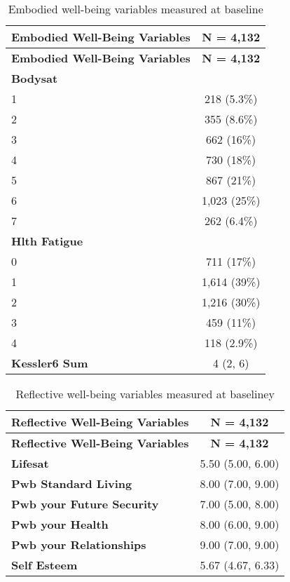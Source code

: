 \documentclass[
  singlecolumn,
  9pt]{article}
\begin{document}
\hypertarget{tbl-table_embody_vars_dogs}{}
\begin{longtable}[]{@{}lc@{}}
\caption{\label{tbl-table_embody_vars_dogs}Embodied well-being variables
measured at baseline}\tabularnewline
\toprule\noalign{}
\textbf{Embodied Well-Being Variables} & \textbf{N = 4,132} \\
\midrule\noalign{}
\endfirsthead
\toprule\noalign{}
\textbf{Embodied Well-Being Variables} & \textbf{N = 4,132} \\
\midrule\noalign{}
\endhead
\bottomrule\noalign{}
\endlastfoot
\textbf{Bodysat} & \\
1 & 218 (5.3\%) \\
2 & 355 (8.6\%) \\
3 & 662 (16\%) \\
4 & 730 (18\%) \\
5 & 867 (21\%) \\
6 & 1,023 (25\%) \\
7 & 262 (6.4\%) \\
\textbf{Hlth Fatigue} & \\
0 & 711 (17\%) \\
1 & 1,614 (39\%) \\
2 & 1,216 (30\%) \\
3 & 459 (11\%) \\
4 & 118 (2.9\%) \\
\textbf{Kessler6 Sum} & 4 (2, 6) \\
\end{longtable}

\hypertarget{tbl-table_reflective_vars_dogs}{}
\begin{longtable}[]{@{}lc@{}}
\caption{\label{tbl-table_reflective_vars_dogs}Reflective well-being
variables measured at baseliney}\tabularnewline
\toprule\noalign{}
\textbf{Reflective Well-Being Variables} & \textbf{N = 4,132} \\
\midrule\noalign{}
\endfirsthead
\toprule\noalign{}
\textbf{Reflective Well-Being Variables} & \textbf{N = 4,132} \\
\midrule\noalign{}
\endhead
\bottomrule\noalign{}
\endlastfoot
\textbf{Lifesat} & 5.50 (5.00, 6.00) \\
\textbf{Pwb Standard Living} & 8.00 (7.00, 9.00) \\
\textbf{Pwb your Future Security} & 7.00 (5.00, 8.00) \\
\textbf{Pwb your Health} & 8.00 (6.00, 9.00) \\
\textbf{Pwb your Relationships} & 9.00 (7.00, 9.00) \\
\textbf{Self Esteem} & 5.67 (4.67, 6.33) \\
\end{longtable}
\end{document}
